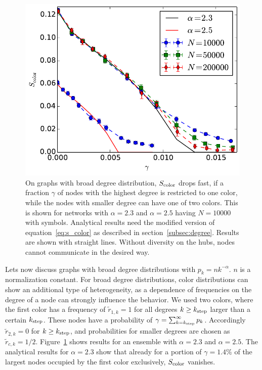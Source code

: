 \documentclass[aps, pre, twocolumn, a4paper, floatfix]{revtex4}
\begin{document}
\begin{figure}[htb]
\begin{center}
    \includegraphics[width=1.0\columnwidth]{S_color_degree_dependent_broad.pdf}
    \caption{On graphs with broad degree distribution, $S_{\rm color}$ drops fast, 
    if a fraction $\gamma$ of nodes with the highest 
    degree is restricted to one color, while the nodes with smaller degree can have one of 
    two colors. This is shown for networks with $\alpha=2.3$ and $\alpha=2.5$ having $N=10000$ 
    with symbols. Analytical results need the modified version of equation~\ref{eq:s_color} 
    as described in section~\ref{subsec:degree}. Results are shown with straight lines. Without diversity 
    on the hubs, nodes cannot communicate in the desired way.}
    \label{fig:degree}
\end{center}
\end{figure}

Lets now discuss graphs with broad degree distributions with 
$p_k=n k^{-\alpha}$. $n$ is a normalization constant. 
For broad degree distributions, color distributions can show an additional type of 
heterogeneity, as a dependence of frequencies on the degree of a node can strongly 
influence the behavior. We used two colors, where the first color has a frequency 
of ${\tilde r}_{1,k}=1$ for all degrees $k\geq k_{\rm step}$ larger than a certain 
$k_{\rm step}$. These nodes have a probability of 
$\gamma=\sum_{k=k_{\rm step}}^{\infty} p_k$. Accordingly 
${\tilde r}_{2,k}=0$ for $k\geq k_{\rm step}$, and probabilities for smaller degrees are chosen as 
${\tilde r}_{c,k}=1/2$. Figure~\ref{fig:degree} shows results for an ensemble with 
$\alpha=2.3$ and $\alpha=2.5$. The analytical results for $\alpha=2.3$ show that already for a portion 
of $\gamma=1.4\%$ of the largest nodes occupied by the first color exclusively, $S_{\rm color}$ vanishes. 
\end{document}
